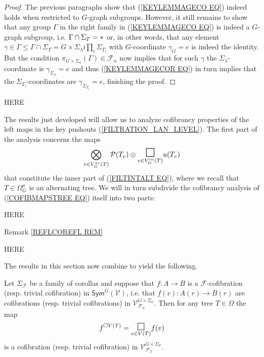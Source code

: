 \documentclass[a4paper,10pt]{article}%
\begin{document}
\begin{proof}
The previous paragraphs show that 
(\ref{KEYLEMMAGECO EQ})
indeed holds when restricted to $G$-graph subgroups. However, it still remains to show that any group $\Gamma$ in the right family in (\ref{KEYLEMMAGECO EQ}) is indeed
a $G$-graph subgroup, i.e. $\Gamma \cap \Sigma_T =\**$ or,
in other words, that any element 
$\gamma \in \Gamma \leq
\Gamma \cap \Sigma_T =
G \times \Sigma_{\lambda} \wr \prod_{i} \Sigma_{T_i}$
with $G$-coordinate 
$\gamma_G = e$ is indeed the identity.
But the condition 
$\pi_{G \times \Sigma_n}(\Gamma) \in \mathcal{F}_n$ now implies that for such $\gamma$ the $\Sigma_{\lambda}$-coordinate is $\gamma_{\Sigma_{\lambda}} = e$
and thus (\ref{KEYLEMMAGECOR EQ}) in turn implies that the 
$\Sigma_{T_i}$-coordinates are 
$\gamma_{\Sigma_{T_i}} = e$,
finishing the proof.
\end{proof}

{\color{red} HERE}

The results just developed will allow us to 
analyze cofibrancy properties of the left maps in the key pushouts (\ref{FILTRATION_LAN_LEVEL}). The first part of the analysis concerns the maps  
\begin{equation}\label{COFIBMAPSTREE EQ}
		\bigotimes\limits_{v \in V_{G}^{ac}(T)}\P(T_v) \otimes
		\underset{v \in V_{G}^{in}(T)}
		{\mathlarger{\mathlarger{\mathlarger{\square}}}}
		u(T_v)
\end{equation}
that constitute the inner part of (\ref{FILTINTALT EQ}),
where we recall that $T \in \Omega_G^a$ is an alternating tree.
We will in turn subdivide the cofibrancy analysis of 
(\ref{COFIBMAPSTREE EQ}) itself into two parts:


{\color{red} HERE}

Remark \ref{REFLCOREFL REM}

{\color{red} HERE}


The results in this section now combine to yield the following.


\begin{proposition}\label{AUTTCOFPUSH PROP}
	Let $\Sigma_{\mathcal{F}}$ be a family of corollas 
	and suppose that 
	$f \colon A \to B$ is a $\mathcal{F}$-cofibration (resp. trivial cofibration)
	in $\mathsf{Sym}^G(\mathcal{V})$, i.e. that 
	$f(r) \colon A(r) \to B(r)$ are cofibrations (resp. trivial cofibrations) in 
	$\mathcal{V}^{G \times \Sigma_n}_{\mathcal{F}_n}$. Then for any tree $T \in \Omega$ the map
	\[
	f^{\square V(T)} = 
	\underset{v \in V(T)}{\mathlarger{\mathlarger{\square}}}
	f(v)\]
	is a cofibration (resp. trivial cofibration) in 
	$\mathcal{V}^{G \times \Sigma_T}_{\mathcal{F}_T}$.
\end{proposition}
\end{document}

